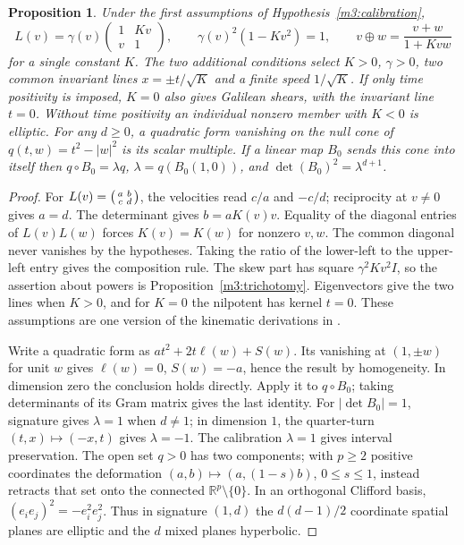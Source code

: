 \documentclass[11pt,reqno]{amsart}
\newtheorem{proposition}[theorem]{Proposition}
\theoremstyle{definition}
\theoremstyle{remark}
\numberwithin{equation}{section}
\newcommand{\R}{\mathbb{R}}
\begin{document}
\begin{proposition}\label{m3:frames}
Under the first assumptions of Hypothesis~\ref{m3:calibration},
\[
 L(v)=\gamma(v)\begin{pmatrix}1&Kv\\v&1\end{pmatrix},\qquad
 \gamma(v)^2(1-Kv^2)=1,\qquad v\oplus w=\frac{v+w}{1+Kvw}
\]
for a single constant \(K\). The two additional conditions select
\(K>0\), \(\gamma>0\), two common invariant lines \(x=\pm t/\sqrt K\)
and a finite speed \(1/\sqrt K\). If only time positivity is imposed,
\(K=0\) also gives Galilean shears, with the invariant line \(t=0\).
Without time positivity an individual nonzero member with \(K<0\)
is elliptic. For any \(d\ge0\), a quadratic form vanishing on the
null cone of \(q(t,w)=t^2-|w|^2\) is its scalar multiple. If a linear
map \(B_0\) sends this cone into itself then \(q\circ B_0=\lambda q\),
\(\lambda=q(B_0(1,0))\), and \(\det(B_0)^2=\lambda^{d+1}\).
\end{proposition}

\begin{proof}
For \(L(v)=\begin{psmallmatrix}a&b\\c&d\end{psmallmatrix}\), the
velocities read \(c/a\) and \(-c/d\); reciprocity at \(v\ne0\) gives
\(a=d\). The determinant gives \(b=aK(v)v\). Equality of the diagonal
entries of \(L(v)L(w)\) forces \(K(v)=K(w)\) for nonzero \(v,w\).
The common diagonal never vanishes by the hypotheses. Taking the ratio
of the lower-left to the upper-left entry gives the composition rule.
The skew part has square \(\gamma^2 Kv^2I\), so the assertion about
powers is Proposition~\ref{m3:trichotomy}. Eigenvectors give the two
lines when \(K>0\), and for \(K=0\) the nilpotent has kernel \(t=0\).
These assumptions are one version of the kinematic derivations
in \cite{m3LevyLeblond,m3Mermin}.

Write a quadratic form as \(a t^2+2t\ell(w)+S(w)\).
Its vanishing at \((1,\pm w)\) for unit \(w\) gives \(\ell(w)=0\),
\(S(w)=-a\), hence the result by homogeneity. In dimension zero the
conclusion holds directly. Apply it to \(q\circ B_0\); taking
determinants of its Gram matrix gives the last identity. For
\(|\det B_0|=1\), signature gives \(\lambda=1\) when \(d\ne1\);
in dimension \(1\), the quarter-turn \((t,x)\mapsto(-x,t)\) gives
\(\lambda=-1\). The calibration \(\lambda=1\) gives interval preservation.
The open set \(q>0\) has two components; with \(p\ge2\) positive
coordinates the deformation \((a,b)\mapsto(a,(1-s)b)\), \(0\le s\le1\),
instead retracts that set onto the connected \(\R^p\setminus\{0\}\).
In an orthogonal Clifford basis, \((e_i e_j)^2=-e_i^2e_j^2\).
Thus in signature \((1,d)\) the \(d(d-1)/2\) coordinate spatial
planes are elliptic and the \(d\) mixed planes hyperbolic.
\end{proof}
\end{document}

